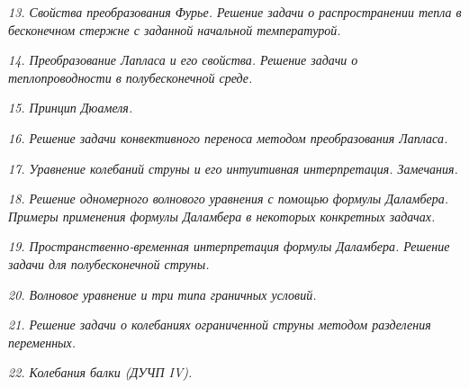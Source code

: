 \newpage %

\emph{13. Свойства преобразования Фурье. Решение задачи о распространении тепла
в бесконечном стержне с заданной начальной температурой.}

\newpage %

\emph{14. Преобразование Лапласа и его свойства. Решение задачи о
теплопроводности в полубесконечной среде.}

\newpage %

\emph{15. Принцип Дюамеля.}

\newpage %

\emph{16. Решение задачи конвективного переноса методом преобразования Лапласа.}

\newpage %

\emph{17. Уравнение колебаний струны и его интуитивная интерпретация.
Замечания.}

\newpage %

\emph{18. Решение одномерного волнового уравнения с помощью формулы Даламбера.
Примеры применения формулы Даламбера в некоторых конкретных задачах.}

\newpage %

\emph{19. Пространственно-временная интерпретация формулы Даламбера. Решение
задачи для полубесконечной струны.}

\newpage %

\emph{20. Волновое уравнение и три типа граничных условий.}

\newpage %

\emph{21. Решение задачи о колебаниях ограниченной струны методом разделения
переменных.}

\newpage %

\emph{22. Колебания балки (ДУЧП IV).}

\newpage %

